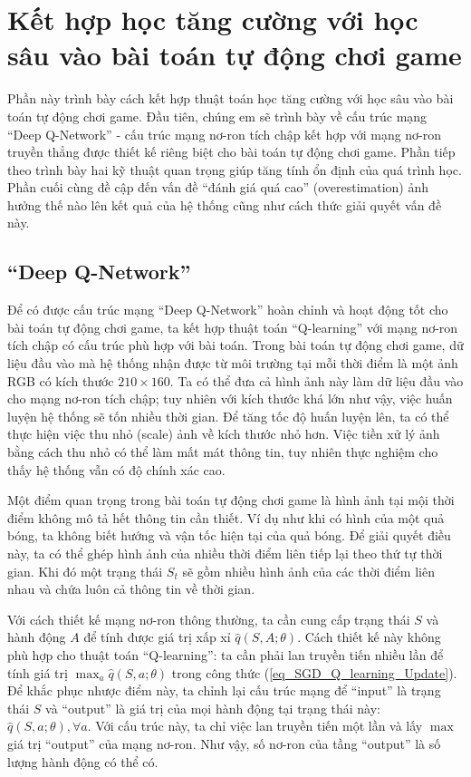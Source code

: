 \section{Kết hợp học tăng cường với học sâu vào bài toán tự động chơi game}
	Phần này trình bày cách kết hợp thuật toán học tăng cường với học sâu vào bài toán tự động chơi game.
	Đầu tiên, chúng em sẽ trình bày về cấu trúc mạng ``Deep Q-Network'' \cite{mnihdqn2015} - cấu trúc mạng nơ-ron tích chập kết hợp với mạng nơ-ron truyền thẳng được thiết kế riêng biệt cho bài toán tự động chơi game.
	Phần tiếp theo trình bày hai kỹ thuật quan trọng giúp tăng tính ổn định của quá trình học.
	Phần cuối cùng đề cập đến vấn đề ``đánh giá quá cao'' (overestimation) ảnh hưởng thế nào lên kết quả của hệ thống cũng như cách thức giải quyết vấn đề này.
	
\subsection{``Deep Q-Network''}
	Để có được cấu trúc mạng ``Deep Q-Network'' \cite{mnihdqn2015} hoàn chỉnh và hoạt động tốt cho bài toán tự động chơi game, ta kết hợp thuật toán ``Q-learning'' với mạng nơ-ron tích chập có cấu trúc phù hợp với bài toán.
	Trong bài toán tự động chơi game, dữ liệu đầu vào mà hệ thống nhận được từ môi trường tại mỗi thời điểm là một ảnh RGB có kích thước $210\times160$.
	Ta có thể đưa cả hình ảnh này làm dữ liệu đầu vào cho mạng nơ-ron tích chập; tuy nhiên với kích thước khá lớn như vậy, việc huấn luyện hệ thống sẽ tốn nhiều thời gian.
	Để tăng tốc độ huấn luyện lên, ta có thể thực hiện việc thu nhỏ (scale) ảnh về kích thước nhỏ hơn.
	Việc tiền xử lý ảnh bằng cách thu nhỏ có thể làm mất mát thông tin, tuy nhiên thực nghiệm cho thấy hệ thống vẫn có độ chính xác cao.
	
	Một điểm quan trọng trong bài toán tự động chơi game là hình ảnh tại mội thời điểm không mô tả hết thông tin cần thiết.
	Ví dụ như khi có hình của một quả bóng, ta không biết hướng và vận tốc hiện tại của quả bóng.
	Để giải quyết điều này, ta có thể ghép hình ảnh của nhiều thời điểm liên tiếp lại theo thứ tự thời gian.
	Khi đó một trạng thái $S_t$ sẽ gồm nhiều hình ảnh của các thời điểm liên nhau và chứa luôn cả thông tin về thời gian.
	
	Với cách thiết kế mạng nơ-ron thông thường, ta cần cung cấp trạng thái $S$ và hành động $A$ để tính được giá trị xấp xỉ $\hat{q}(S, A;\theta)$.
	Cách thiết kế này không phù hợp cho thuật toán ``Q-learning'': ta cần phải lan truyền tiến nhiều lần để tính giá trị $\max_{a}\hat{q}(S, a;\theta)$ trong công thức (\ref{eq_SGD_Q_learning_Update}).
	Để khắc phục nhược điểm này, ta chỉnh lại cấu trúc mạng để ``input'' là trạng thái $S$ và ``output'' là giá trị của mọi hành động tại trạng thái này: $\hat{q}(S, a;\theta), \forall a$.
	Với cấu trúc này, ta chỉ việc lan truyền tiến một lần và lấy $\max$ giá trị ``output'' của mạng nơ-ron.
	Như vậy, số nơ-ron của tầng ``output'' là số lượng hành động có thể có.
	
